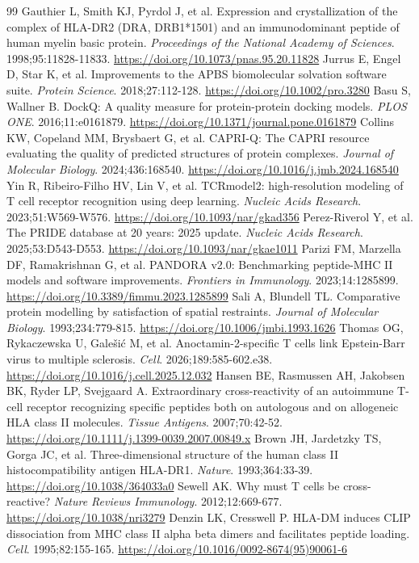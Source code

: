 \begin{thebibliography}{99}
 Gauthier L, Smith KJ, Pyrdol J, et al. Expression and crystallization of the complex of HLA-DR2 (DRA, DRB1*1501) and an immunodominant peptide of human myelin basic protein. \textit{Proceedings of the National Academy of Sciences}. 1998;95:11828-11833. \url{https://doi.org/10.1073/pnas.95.20.11828}
 Jurrus E, Engel D, Star K, et al. Improvements to the APBS biomolecular solvation software suite. \textit{Protein Science}. 2018;27:112-128. \url{https://doi.org/10.1002/pro.3280}
 Basu S, Wallner B. DockQ: A quality measure for protein-protein docking models. \textit{PLOS ONE}. 2016;11:e0161879. \url{https://doi.org/10.1371/journal.pone.0161879}
 Collins KW, Copeland MM, Brysbaert G, et al. CAPRI-Q: The CAPRI resource evaluating the quality of predicted structures of protein complexes. \textit{Journal of Molecular Biology}. 2024;436:168540. \url{https://doi.org/10.1016/j.jmb.2024.168540}
 Yin R, Ribeiro-Filho HV, Lin V, et al. TCRmodel2: high-resolution modeling of T cell receptor recognition using deep learning. \textit{Nucleic Acids Research}. 2023;51:W569-W576. \url{https://doi.org/10.1093/nar/gkad356}
 Perez-Riverol Y, et al. The PRIDE database at 20 years: 2025 update. \textit{Nucleic Acids Research}. 2025;53:D543-D553. \url{https://doi.org/10.1093/nar/gkae1011}
 Parizi FM, Marzella DF, Ramakrishnan G, et al. PANDORA v2.0: Benchmarking peptide-MHC II models and software improvements. \textit{Frontiers in Immunology}. 2023;14:1285899. \url{https://doi.org/10.3389/fimmu.2023.1285899}
 Sali A, Blundell TL. Comparative protein modelling by satisfaction of spatial restraints. \textit{Journal of Molecular Biology}. 1993;234:779-815. \url{https://doi.org/10.1006/jmbi.1993.1626}
 Thomas OG, Rykaczewska U, Galešić M, et al. Anoctamin-2-specific T cells link Epstein-Barr virus to multiple sclerosis. \textit{Cell}. 2026;189:585-602.e38. \url{https://doi.org/10.1016/j.cell.2025.12.032}
 Hansen BE, Rasmussen AH, Jakobsen BK, Ryder LP, Svejgaard A. Extraordinary cross-reactivity of an autoimmune T-cell receptor recognizing specific peptides both on autologous and on allogeneic HLA class II molecules. \textit{Tissue Antigens}. 2007;70:42-52. \url{https://doi.org/10.1111/j.1399-0039.2007.00849.x}
 Brown JH, Jardetzky TS, Gorga JC, et al. Three-dimensional structure of the human class II histocompatibility antigen HLA-DR1. \textit{Nature}. 1993;364:33-39. \url{https://doi.org/10.1038/364033a0}
 Sewell AK. Why must T cells be cross-reactive? \textit{Nature Reviews Immunology}. 2012;12:669-677. \url{https://doi.org/10.1038/nri3279}
 Denzin LK, Cresswell P. HLA-DM induces CLIP dissociation from MHC class II alpha beta dimers and facilitates peptide loading. \textit{Cell}. 1995;82:155-165. \url{https://doi.org/10.1016/0092-8674(95)90061-6}
\end{thebibliography}
